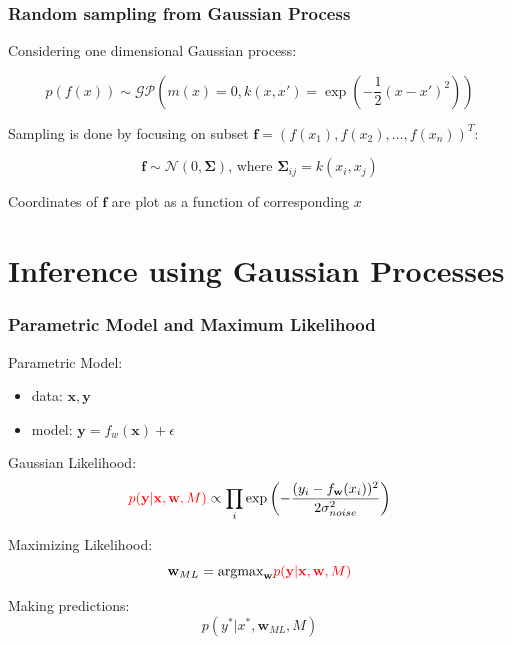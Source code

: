 \documentclass[10pt]{beamer}
\newcommand{\bx}{\mathbf{x}}
\newcommand{\by}{\mathbf{y}}
\newcommand{\bw}{\mathbf{w}}
\newcommand{\boldf}{\mathbf{f}}
\newcommand{\gp}{\mathcal{GP}}
\newcommand{\gaussN}{\mathcal{N}}
\newcommand{\argmax}{\text{argmax}}
\newcommand{\bSig}{\boldsymbol{\Sigma}}
\begin{document}
  \begin{frame}
    \frametitle{Random sampling from Gaussian Process}
    Considering one dimensional Gaussian process:

    \begin{equation*}
      p(f(x)) \sim \gp \left( m(x) = 0, k(x,x') = \exp \left( - \frac{1}{2} (x - x')^2 \right) \right)
    \end{equation*}

    \pause

    Sampling is done by focusing on subset $\boldf = (f(x_1), f(x_2),\dots,f(x_n))^T$:

    \begin{equation*}
      \boldf \sim \gaussN(0,\bSig) \text{, where } \bSig_{ij} = k(x_i,x_j)
    \end{equation*}

    Coordinates of $\boldf$ are plot as a function of corresponding $x$
  \end{frame}

  \section{Inference using Gaussian Processes}

  \begin{frame}
    \frametitle{Parametric Model and Maximum Likelihood}
    Parametric Model:
      \begin{itemize}
        \item data: $\bx, \by$
        \item model: $\by = f_w(\bx) + \epsilon$
      \end{itemize}

    \pause

    Gaussian Likelihood:
      \begin{equation*}
        \textcolor{red}{p(\by|\bx, \bw, M)} \propto \prod_i \exp \left( - \frac{ (y_i - f_{\bw}(x_i))^2}{2 \sigma_{noise}^2} \right)
      \end{equation*}

    \pause

    Maximizing Likelihood:
      \begin{equation*}
        \bw_{ML} = \argmax_{\bw} \textcolor{red}{p(\by|\bx,\bw,M)}
      \end{equation*}

    \pause

    Making predictions:
      \begin{equation*}
        p(y^*|x^*,\bw_{ML},M)
      \end{equation*}
  \end{frame}
\end{document}
